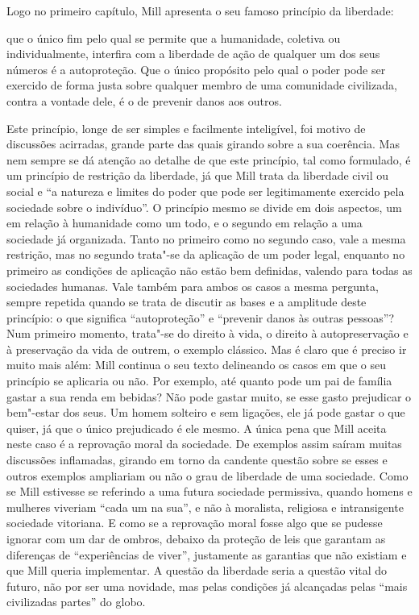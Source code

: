 Logo no primeiro capítulo, Mill
apresenta o seu famoso princípio da liberdade: 

\begin{hedraquote}
que o único fim
pelo qual se permite que a humanidade, coletiva ou individualmente,
interfira com a liberdade de ação de qualquer um dos seus números é a
autoproteção. Que o único propósito pelo qual o poder pode ser exercido
de forma justa sobre qualquer membro de uma comunidade civilizada,
contra a vontade dele, é o de prevenir danos aos outros.
\end{hedraquote}

Este princípio, longe de ser simples e facilmente inteligível, foi motivo de
discussões acirradas, grande parte das quais girando sobre a sua
coerência. Mas nem sempre se dá atenção ao detalhe de que este
princípio, tal como formulado, é um princípio de restrição da
liberdade, já que Mill trata da liberdade civil ou social e ``a
natureza e limites do poder que pode ser legitimamente exercido pela
sociedade sobre o indivíduo''. O princípio mesmo se divide em dois
aspectos, um em relação à humanidade como um todo, e o segundo em
relação a uma sociedade já organizada. Tanto no primeiro como no
segundo caso, vale a mesma restrição, mas no segundo trata"-se
da aplicação de um poder legal, enquanto no primeiro as condições de
aplicação não estão bem definidas, valendo para todas as sociedades
humanas. Vale também para ambos os casos a mesma pergunta, sempre
repetida quando se trata de discutir as bases e a amplitude deste
princípio: o que significa ``autoproteção'' e ``prevenir danos às outras
pessoas''? Num primeiro momento, trata"-se do direito à vida, o direito
à autopreservação e à preservação da vida de outrem, o exemplo
clássico. Mas é claro que é preciso ir muito mais além: Mill continua o
seu texto delineando os casos em que o seu princípio se aplicaria ou
não. Por exemplo, até quanto pode um pai de família gastar a sua renda
em bebidas? Não pode gastar muito, se esse gasto prejudicar o
bem"-estar dos seus. Um homem solteiro e sem ligações, ele já pode
gastar o que quiser, já que o único prejudicado é ele mesmo. A única
pena que Mill aceita neste caso é a reprovação moral da sociedade. De
exemplos assim saíram muitas discussões inflamadas, girando em torno da
candente questão sobre se esses e outros exemplos ampliariam ou não o grau de
liberdade de uma sociedade. Como se Mill estivesse se referindo a uma
futura sociedade permissiva, quando homens e mulheres viveriam ``cada um
na sua'', e não à moralista, religiosa e intransigente sociedade
vitoriana. E como se a reprovação moral fosse algo que se pudesse
ignorar com um dar de ombros, debaixo da proteção de leis que garantam
as diferenças de ``experiências de viver'', justamente as garantias que
não existiam e que Mill queria implementar. A questão da liberdade
seria a questão vital do futuro, não por ser uma novidade, mas pelas
condições já alcançadas pelas ``mais civilizadas partes'' do globo. 

